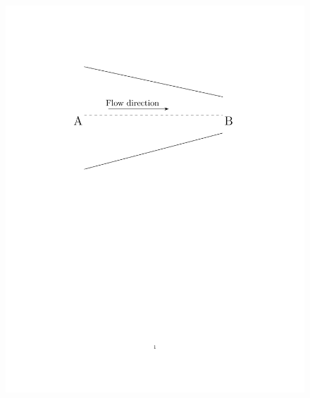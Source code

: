 \documentclass[journal,12pt,onecolumn,article]{IEEEtran}
\theoremstyle{remark}
\begin{document}
\begin{enumerate}
		\vspace{-75pt}
			\begin{figure}[H]
	\centering
				\begin{minipage}{0.75\textwidth}
	\includegraphics[width=0.7\linewidth]{fig/fig30/fig30.pdf}
			\end{minipage}
			\end{figure}
		\vspace{-180pt}


\end{enumerate}
\end{document}
